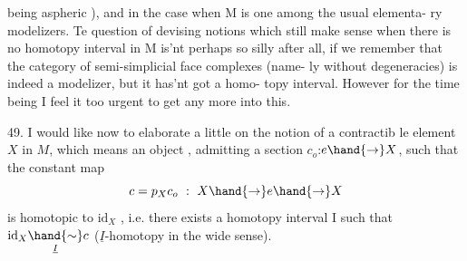 being aspheric ),  and in the case when M is one among the usual elementa-%
ry modelizers.  Te question of devising notions which still make sense
when there is no homotopy interval in M is'nt perhaps so silly after all,
if we remember that the category of semi-simplicial face complexes (name-%
ly without degeneracies) is indeed a modelizer,  but it has'nt got a homo-%
topy interval.  However for the time being I feel it  too urgent to
 get any more into this.

 49.   I would like now to elaborate a little on the notion of a contractib%
le element  $X$ in $M$,  which  means an object ,  admitting a section $c_o$:$e\hand{\to} X$,
such that the constant map
\[ c = p_X c_o \ :\ X \hand{\to} e \hand{\to} X \]
is  homotopic to $\mathrm{id}_X$  ,  i.e. there exists a homotopy interval I such that
$\mathrm{id}_X \underset{\underline{I}}{\hand{\sim}} c$  ($\underline{I}$-homotopy in the wide sense).

